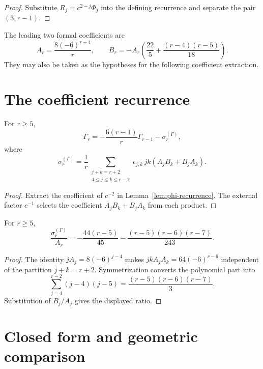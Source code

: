 \begin{proof}
Substitute \(R_j=c^{2-j}\Phi_j\) into the defining recurrence and
separate the pair \((3,r-1)\).
\end{proof}

The leading two formal coefficients are
\[
 A_r=\frac{8(-6)^{r-4}}r,
 \qquad
 B_r=-A_r\left(\frac{22}{5}
 +\frac{(r-4)(r-5)}{18}\right).
\]
They may also be taken as the hypotheses for the following coefficient
extraction.

\section{The coefficient recurrence}
\label{sec:stss-recurrence}

\begin{proposition}
\label{prop:gamma-recurrence}
\ClaimStatusProvedHere
For \(r\ge5\),
\[
 \Gamma_r=-\frac{6(r-1)}r\Gamma_{r-1}-\sigma_r^{(\Gamma)},
\]
where
\[
 \sigma_r^{(\Gamma)}=
 \frac1r\sum_{\substack{j+k=r+2\\4\le j\le k\le r-2}}
 \epsilon_{j,k}\,jk(A_jB_k+B_jA_k).
\]
\end{proposition}

\begin{proof}
Extract the coefficient of \(c^{-2}\) in
Lemma~\ref{lem:phi-recurrence}.  The external factor \(c^{-1}\)
selects the coefficient \(A_jB_k+B_jA_k\) from each product.
\end{proof}

\begin{lemma}
\label{lem:gamma-source-ratio-closed-form}
\ClaimStatusProvedHere
For \(r\ge5\),
\[
 \frac{\sigma_r^{(\Gamma)}}{A_r}
 =-\frac{44(r-5)}{45}
 -\frac{(r-5)(r-6)(r-7)}{243}.
\]
\end{lemma}

\begin{proof}
The identity \(jA_j=8(-6)^{j-4}\) makes
\(jkA_jA_k=64(-6)^{r-6}\) independent of the partition
\(j+k=r+2\).  Symmetrization converts the polynomial part into
\[
 \sum_{j=4}^{r-2}(j-4)(j-5)
 =\frac{(r-5)(r-6)(r-7)}3.
\]
Substitution of \(B_j/A_j\) gives the displayed ratio.
\end{proof}

\section{Closed form and geometric comparison}
\label{sec:stss-closed-form}

